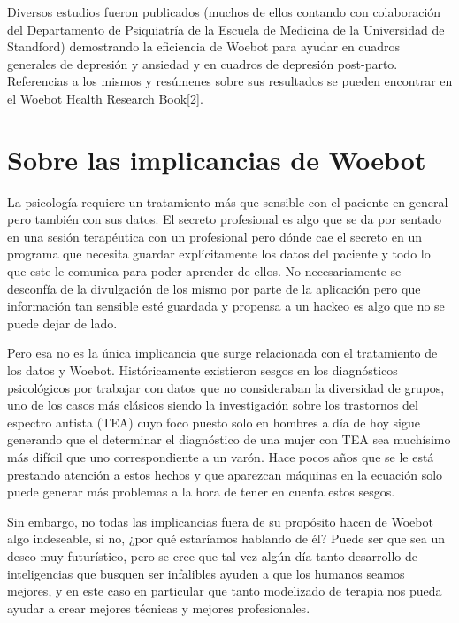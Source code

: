 \documentclass[11pt]{article}
\begin{document}
Diversos estudios fueron publicados (muchos de ellos contando con colaboración del Departamento de Psiquiatría de la Escuela de Medicina de la Universidad de Standford) demostrando la eficiencia de Woebot para ayudar en cuadros generales de depresión y ansiedad y en cuadros de depresión post-parto.
Referencias a los mismos y resúmenes sobre sus resultados 
se pueden encontrar en el Woebot Health Research Book[2]. 

\section{Sobre las implicancias de Woebot}

La psicología requiere un tratamiento más que sensible
con el paciente en general pero también con sus datos.
El secreto profesional es algo que se da por sentado en
una sesión terapéutica con un profesional pero dónde cae
el secreto en un programa que necesita guardar explícitamente
los datos del paciente y todo lo que este le comunica
para poder aprender de ellos. No necesariamente se desconfía
de la divulgación de los mismo por parte de la aplicación
pero que información tan sensible esté guardada y propensa a
un hackeo es algo que no se puede dejar de lado.

Pero esa no es la única implicancia que surge relacionada
con el tratamiento de los datos y Woebot. Históricamente 
existieron sesgos en los diagnósticos psicológicos por 
trabajar con datos que no consideraban la diversidad de
grupos, uno de los casos más clásicos siendo la 
investigación sobre los trastornos del espectro autista
(TEA)
cuyo foco puesto solo en hombres a día de hoy sigue 
generando que el determinar el diagnóstico de una 
mujer con TEA sea muchísimo más difícil que uno
correspondiente a un varón. Hace pocos años que 
se le está prestando atención a estos hechos y 
que aparezcan máquinas
en la ecuación solo puede generar más problemas a la 
hora de tener en cuenta estos sesgos. 

Sin embargo, no todas las implicancias fuera de su propósito
hacen de Woebot algo indeseable, si no, ¿por qué estaríamos 
hablando de él? Puede ser que sea un deseo muy futurístico,
pero se cree que tal vez algún día tanto desarrollo de 
inteligencias que busquen ser infalibles ayuden a que los
humanos seamos mejores, y en este caso en particular que 
tanto modelizado de terapia nos pueda ayudar a crear 
mejores técnicas y mejores profesionales.


\end{document}

